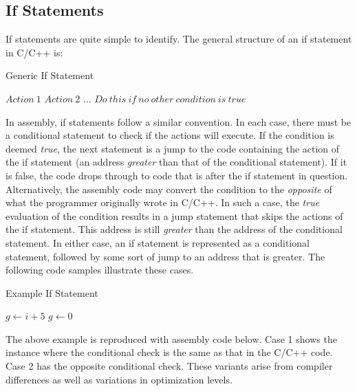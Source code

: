 \documentclass{article}
\begin{document}
\subsection*{If Statements}
If statements are quite simple to identify.  The general structure of an if statement in C/C++ is: \\

\begin{algorithm}
\caption{Generic If Statement}
\begin{algorithmic}
\STATE $Action \ 1$
\STATE $Action \ 2$
\STATE $\ldots$
\ELSE
\STATE $Do \ this \ if \ no \ other \ condition \ is \ true$
\ENDIF
\end{algorithmic}
\end{algorithm}
In assembly, if statements follow a similar convention.  In each case, there must be a conditional statement to check if the actions will execute.  If the condition is deemed \emph{true}, the next statement
is a jump to the code containing the action of the if statement (an address \emph{greater} than that of the conditional statement). If it is false, the code drops through to code that is after the if statement in question.
Alternatively, the assembly code may convert the condition to the \emph{opposite} of what the programmer originally wrote in C/C++.  In such a case, the \emph{true} evaluation of the condition results in a
jump statement that skips the actions of the if statement.  This address is still \emph{greater} than the address of the conditional statement.  In either case, an if statement is represented as a conditional
statement, followed by some sort of jump to an address that is greater.  The following code samples illustrate these cases. \\

\begin{algorithm}
\caption{Example If Statement}
\begin{algorithmic}
\STATE $g\gets i+5$
\ELSE
\STATE $g\gets 0$
\ENDIF
\end{algorithmic}
\end{algorithm} 

The above example is reproduced with assembly code below.  Case 1 shows the instance where the conditional check is the same as that in the C/C++ code.  Case 2 has the opposite conditional check.  These 
variants arise from compiler differences as well as variations in optimization levels.   \\
\end{document}
